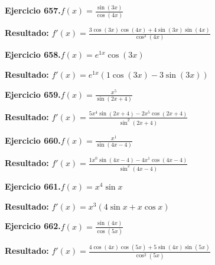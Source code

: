\documentclass[10pt,a4paper]{article}
\begin{document}
\begin{ejbox}
\textbf{Ejercicio 657.}\quad $f(x) = \frac{\sin(3x)}{\cos(4x)}$
\end{ejbox}

\begin{solbox}
\textbf{Resultado:} \(\displaystyle f'(x) = \frac{3\cos(3x)\cos(4x) + 4\sin(3x)\sin(4x)}{\cos^2(4x)}\)
\end{solbox}

\newpage
\begin{ejbox}
\textbf{Ejercicio 658.}\quad $f(x) = e^{1x} \cos(3x)$
\end{ejbox}

\begin{solbox}
\textbf{Resultado:} \(\displaystyle f'(x) = e^{1x}(1\cos(3x) - 3\sin(3x))\)
\end{solbox}

\begin{ejbox}
\textbf{Ejercicio 659.}\quad $f(x) = \frac{x^{5}}{\sin(2x +4)}$
\end{ejbox}

\begin{solbox}
\textbf{Resultado:} \(\displaystyle f'(x) = \frac{5x^{4}\sin(2x +4) - 2x^{5}\cos(2x +4)}{\sin^2(2x +4)}\)
\end{solbox}

\begin{ejbox}
\textbf{Ejercicio 660.}\quad $f(x) = \frac{x^{1}}{\sin(4x -4)}$
\end{ejbox}

\begin{solbox}
\textbf{Resultado:} \(\displaystyle f'(x) = \frac{1x^{0}\sin(4x -4) - 4x^{1}\cos(4x -4)}{\sin^2(4x -4)}\)
\end{solbox}

\newpage
\begin{ejbox}
\textbf{Ejercicio 661.}\quad $f(x) = x^{4} \sin x$
\end{ejbox}

\begin{solbox}
\textbf{Resultado:} \(\displaystyle f'(x) = x^{3}(4\sin x + x\cos x)\)
\end{solbox}

\begin{ejbox}
\textbf{Ejercicio 662.}\quad $f(x) = \frac{\sin(4x)}{\cos(5x)}$
\end{ejbox}

\begin{solbox}
\textbf{Resultado:} \(\displaystyle f'(x) = \frac{4\cos(4x)\cos(5x) + 5\sin(4x)\sin(5x)}{\cos^2(5x)}\)
\end{solbox}
\end{document}
